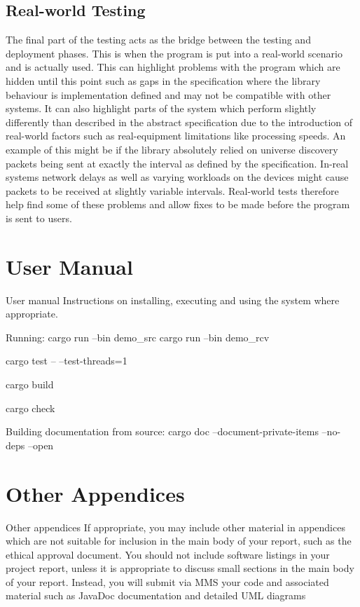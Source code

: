 \documentclass[11pt,a4paper]{report}
\begin{document}
	\subsection{Real-world Testing}
	The final part of the testing acts as the bridge between the testing and deployment phases. This is when the program is put into a real-world scenario and is actually used. This can highlight problems with the program which are hidden until this point such as gaps in the specification where the library behaviour is implementation defined and may not be compatible with other systems. It can also highlight parts of the system which perform slightly differently than described in the abstract specification due to the introduction of real-world factors such as real-equipment limitations like processing speeds. An example of this might be if the library absolutely relied on universe discovery packets being sent at exactly the interval as defined by the specification. In-real systems network delays as well as varying workloads on the devices might cause packets to be received at slightly variable intervals. Real-world tests therefore help find some of these problems and allow fixes to be made before the program is sent to users.
	
	
	\section{User Manual}
	User manual Instructions on installing, executing and using the
	system where appropriate.
	
	Running:
	cargo run --bin demo\_src
	cargo run --bin demo\_rcv
	
	cargo test -- --test-threads=1
	
	cargo build
	
	cargo check
	
	Building documentation from source:
	cargo doc --document-private-items --no-deps --open
	
	\section{Other Appendices}
	Other
	appendices
	If appropriate, you may include other material in
	appendices which are not suitable for inclusion in the
	main body of your report, such as the ethical approval
	document.
	You should not include software listings in your project report, unless it is
	appropriate to discuss small sections in the main body of your report. Instead,
	you will submit via MMS your code and associated material such as JavaDoc
	documentation and detailed UML diagrams
	
\end{document}
